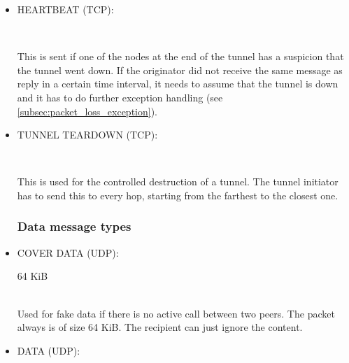 \documentclass{article}
\begin{document}
\begin{itemize}
\label{itm:heartbeat}
\item HEARTBEAT (TCP): \\

\begin{bytefield}[bitwidth=2.2em]{16}
	 \\
\end{bytefield}

This is sent if one of the nodes at the end of the tunnel has a suspicion that the tunnel went down.
If the originator did not receive the same message as reply in a certain time interval, it needs to
assume that the tunnel is down and it has to do further exception handling (see
\ref{subsec:packet_loss_exception}).
	
\item TUNNEL TEARDOWN (TCP): \\

\begin{bytefield}[bitwidth=2.2em]{16}
	 \\
\end{bytefield}

This is used for the controlled destruction of a tunnel. The tunnel initiator has to send this to every hop, starting from the farthest to the closest one.

\subsubsection{Data message types}

\item COVER DATA (UDP): \\

\begin{bytefield}[bitwidth=2.2em]{16}
	\begin{rightwordgroup}{64 KiB}
		 \\
		 \\
	\end{rightwordgroup}
\end{bytefield}

Used for fake data if there is no active call between two peers. The packet always is of size 64 KiB. The recipient can just ignore the content.


\item DATA (UDP): \\


\end{itemize}
\end{document}

